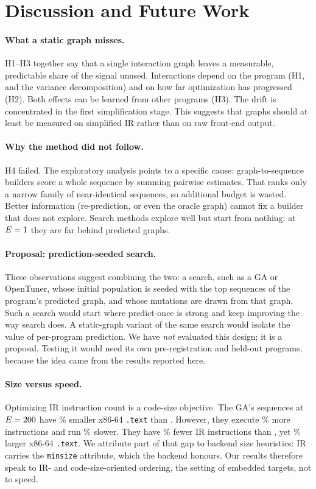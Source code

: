 \section{Discussion and Future Work}
\label{sec:discussion}

\paragraph{What a static graph misses.}
H1--H3 together say that a single interaction graph leaves a measurable, predictable share of the
signal unused. Interactions depend on the program (H1, and the variance decomposition) and on how
far optimization has progressed (H2). Both effects can be learned from other programs (H3). The
drift is concentrated in the first simplification stage. This suggests that graphs should at
least be measured on simplified IR rather than on raw front-end output.

\paragraph{Why the method did not follow.}
H4 failed. The exploratory analysis points to a specific cause: graph-to-sequence builders score a
whole sequence by summing pairwise estimates. That ranks only a narrow family of near-identical
sequences, so additional budget is wasted. Better information (re-prediction, or even the oracle
graph) cannot fix a builder that does not explore. Search methods explore well but start from
nothing: at $E=1$ they are far behind predicted graphs.

\paragraph{Proposal: prediction-seeded search.}
These observations suggest combining the two: a search, such as a GA or OpenTuner, whose initial
population is seeded with the top sequences of the program's predicted graph, and whose mutations
are drawn from that graph. Such a search would start where predict-once is strong and keep
improving the way search does. A static-graph variant of the same search would isolate the value
of per-program prediction. We have \emph{not} evaluated this design; it is a proposal. Testing it
would need its own pre-registration and held-out programs, because the idea came from the results
reported here.

\paragraph{Size versus speed.}
Optimizing IR instruction count is a code-size objective. The GA's sequences at $E=200$ have
\MGAOThreeSizePct\% smaller x86-64 \texttt{.text} than \Othree{}. However, they execute
\MGAOThreeDynWorse\% more instructions and run \MGAOThreeRuntimeWorse\% slower. They have
\MGAOzIRPct\% fewer IR instructions than \Oz{}, yet \MGAOzSizeWorse\% larger x86-64 \texttt{.text}.
We attribute part of that gap to backend size heuristics: \Oz{} IR carries the \texttt{minsize}
attribute, which the backend honours. Our results therefore speak to IR- and code-size-oriented
ordering, the setting of embedded targets, not to speed.
